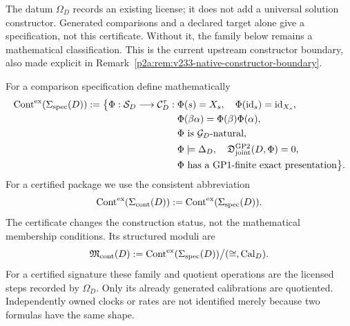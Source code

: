 \documentclass[12pt,a4paper]{article}
\begin{document}
\begin{definition}
The datum \(\Omega_D\) records an existing license; it does not add a
universal solution constructor. Generated comparisons and a declared target
alone give a specification, not this certificate. Without it, the family
below remains a mathematical classification. This is the current upstream
constructor boundary, also made explicit in
Remark~\ref{p2a:rem:v233-native-constructor-boundary}.
\end{definition}

\begin{definition}
\label{p3a:def:exact-continuation-moduli}
For a comparison specification define mathematically
\[
\begin{split}
 \operatorname{Cont}^{\rm ex}(\Sigma_{\rm spec}(D))
 :=\bigl\{\Phi:\mathcal S_D\longrightarrow\mathcal C_D^\tau:\;&
       \Phi(s)=X_s,\quad
       \Phi(\operatorname{id}_s)=\operatorname{id}_{X_s},\\
     & \Phi(\beta\alpha)=\Phi(\beta)\Phi(\alpha),\\
     & \Phi\text{ is }\mathcal G_D\text{-natural},\\
     & \Phi\models\Delta_D,\quad
       \mathfrak D_{\rm joint}^{\rm GP2}(D,\Phi)=0,\\
     & \Phi\text{ has a GP1-finite exact presentation}
       \bigr\}.
\end{split}
\]
For a certified package we use the consistent abbreviation
\[
 \operatorname{Cont}^{\rm ex}(\Sigma_{\rm cont}(D))
 :=\operatorname{Cont}^{\rm ex}(\Sigma_{\rm spec}(D)).
\]
The certificate changes the construction status, not the mathematical
membership conditions. Its structured moduli are
\[
 \mathfrak M_{\rm cont}(D)
 :=
 \operatorname{Cont}^{\rm ex}(\Sigma_{\rm spec}(D))
 \big/(\cong,\operatorname{Cal}_D).
\]
For a certified signature these family and quotient operations are the
licensed steps recorded by \(\Omega_D\). Only its already generated
calibrations are quotiented. Independently owned clocks or rates are not
identified merely because two formulas have the same shape.
\end{definition}
\end{document}
